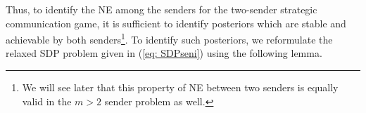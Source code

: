\documentclass[12pt,journal,onecolumn]{IEEEtran}
\begin{document}


Thus, to identify the NE among the senders for the two-sender strategic communication game, it is sufficient to identify posteriors which are stable and achievable by both senders\footnote{We will see later that this property of NE between two senders is equally valid in the $m>2$ sender problem as well.}. To identify such posteriors, we reformulate the relaxed SDP problem given in (\ref{eq: SDPseni}) using the following lemma.
\end{document}
